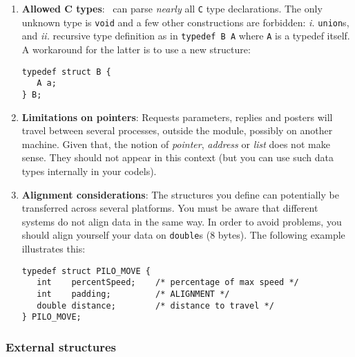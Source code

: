 \begin{enumerate}
\item {\bf Allowed C types}: \GenoM\ can parse {\em nearly} all {\tt C}
type declarations. The  only unknown type  is {\tt void}  and a few other
constructions are  forbidden:  {\em i.}   {\tt  union}s,  and  {\em  ii.}
recursive type definition as   in {\tt typedef B A}   where {\tt A}  is a
typedef itself. A workaround for the latter is to use a new structure:

\begin{center}\begin{cartouche}\small\begin{verbatim}
typedef struct B {
   A a;
} B;
\end{verbatim}\end{cartouche}\end{center}

\item {\bf Limitations on pointers}: Requests parameters, replies and
posters  will  travel  between  several  processes,  outside  the module,
possibly on  another machine.  Given that,  the  notion of {\em pointer},
{\em address} or {\em list} does not make  sense.  They should not appear
in this context (but  you  can use  such data  types internally in   your
codels).

\item {\bf Alignment considerations}: The structures you define can
potentially be transferred across several  platforms.  You must be  aware
that different systems do not  align data in   the same way. In order  to
avoid problems, you should  align yourself your data  on {\tt double}s (8
bytes). The following example illustrates this:

\begin{center}\begin{cartouche}\small\begin{verbatim}
typedef struct PILO_MOVE {
   int    percentSpeed;    /* percentage of max speed */
   int    padding;         /* ALIGNMENT */
   double distance;        /* distance to travel */
} PILO_MOVE;
\end{verbatim}\end{cartouche}\end{center}

\end{enumerate}


\subsubsection{External structures}

